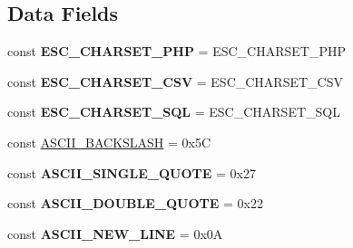 \subsection*{Data Fields}
\begin{DoxyCompactItemize}
\item 
\hypertarget{class_able_polecat___data___primitive___scalar___string_a1e7a87fd53360ba05d8f82143446206e}{}const {\bfseries E\+S\+C\+\_\+\+C\+H\+A\+R\+S\+E\+T\+\_\+\+P\+H\+P} = \textquotesingle{}E\+S\+C\+\_\+\+C\+H\+A\+R\+S\+E\+T\+\_\+\+P\+H\+P\textquotesingle{}\label{class_able_polecat___data___primitive___scalar___string_a1e7a87fd53360ba05d8f82143446206e}

\item 
\hypertarget{class_able_polecat___data___primitive___scalar___string_ad1975ce7cca20f22a13e2e0c4fea17da}{}const {\bfseries E\+S\+C\+\_\+\+C\+H\+A\+R\+S\+E\+T\+\_\+\+C\+S\+V} = \textquotesingle{}E\+S\+C\+\_\+\+C\+H\+A\+R\+S\+E\+T\+\_\+\+C\+S\+V\textquotesingle{}\label{class_able_polecat___data___primitive___scalar___string_ad1975ce7cca20f22a13e2e0c4fea17da}

\item 
\hypertarget{class_able_polecat___data___primitive___scalar___string_a096283db5c32ede3c7f2d8b90ec1fc37}{}const {\bfseries E\+S\+C\+\_\+\+C\+H\+A\+R\+S\+E\+T\+\_\+\+S\+Q\+L} = \textquotesingle{}E\+S\+C\+\_\+\+C\+H\+A\+R\+S\+E\+T\+\_\+\+S\+Q\+L\textquotesingle{}\label{class_able_polecat___data___primitive___scalar___string_a096283db5c32ede3c7f2d8b90ec1fc37}

\item 
const \hyperlink{class_able_polecat___data___primitive___scalar___string_a325270274e54b22cda0ff9e990b67bdf}{A\+S\+C\+I\+I\+\_\+\+B\+A\+C\+K\+S\+L\+A\+S\+H} = 0x5\+C
\item 
\hypertarget{class_able_polecat___data___primitive___scalar___string_ad548872bae1de00276e9fe711e9f05a3}{}const {\bfseries A\+S\+C\+I\+I\+\_\+\+S\+I\+N\+G\+L\+E\+\_\+\+Q\+U\+O\+T\+E} = 0x27\label{class_able_polecat___data___primitive___scalar___string_ad548872bae1de00276e9fe711e9f05a3}

\item 
\hypertarget{class_able_polecat___data___primitive___scalar___string_a007b8b46e487a1c4af63a14735da27f5}{}const {\bfseries A\+S\+C\+I\+I\+\_\+\+D\+O\+U\+B\+L\+E\+\_\+\+Q\+U\+O\+T\+E} = 0x22\label{class_able_polecat___data___primitive___scalar___string_a007b8b46e487a1c4af63a14735da27f5}

\item 
\hypertarget{class_able_polecat___data___primitive___scalar___string_a45180f3b50fd2e497e9172dd7d3a19f0}{}const {\bfseries A\+S\+C\+I\+I\+\_\+\+N\+E\+W\+\_\+\+L\+I\+N\+E} = 0x0\+A\label{class_able_polecat___data___primitive___scalar___string_a45180f3b50fd2e497e9172dd7d3a19f0}


\end{DoxyCompactItemize}
